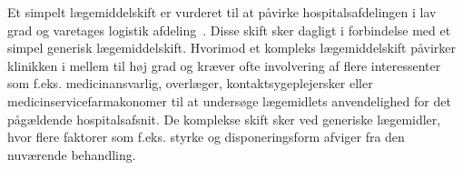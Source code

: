 Et simpelt lægemiddelskift er vurderet til at påvirke hospitalsafdelingen i lav grad og varetages logistik afdeling~\citep{Laegemiddelinformaion2017, Sygehusapoteket2017a}. Disse skift sker dagligt i forbindelse med et simpel generisk lægemiddelskift. Hvorimod et kompleks lægemiddelskift påvirker klinikken i mellem til høj grad og kræver ofte involvering af flere interessenter som f.eks. medicinansvarlig, overlæger, kontaktsygeplejersker eller medicinservicefarmakonomer til at undersøge lægemidlets anvendelighed for det pågældende hospitalsafsnit. 
De komplekse skift sker ved generiske lægemidler, hvor flere faktorer som f.eks. styrke og disponeringsform afviger fra den nuværende behandling.~\citep{Laegemiddelinformaion2017,Sygehusapoteket2017a}
